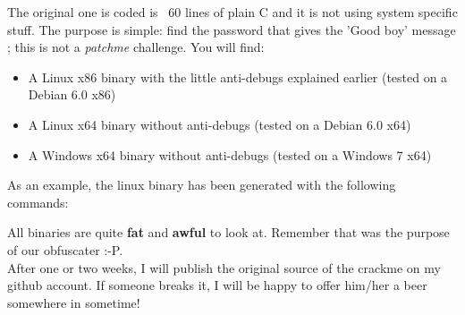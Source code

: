\documentclass[a4paper, 11pt, notitlepage]{report}
\begin{document}
The original one is coded is  ~60 lines of plain C and it is not using system specific stuff.
The purpose is simple: find the password that gives the 'Good boy' message ; this is not a \textit{patchme} challenge.
 You will find:
\begin{itemize}
	\item A Linux x86 binary with the little anti-debugs explained earlier (tested on a Debian 6.0 x86)
	\item A Linux x64 binary without anti-debugs (tested on a Debian 6.0 x64)
	\item A Windows x64 binary without anti-debugs (tested on a Windows 7 x64)
\end{itemize}
As an example, the linux binary has been generated with the following commands:
All binaries are quite \textbf{fat} and \textbf{awful} to look at. Remember that was the purpose of our obfuscater :-P.\\ After one or two weeks, I will publish the original source of the crackme on my github account. If someone breaks it, I will be happy to offer him/her a beer somewhere in sometime!
\newpage
\end{document}
